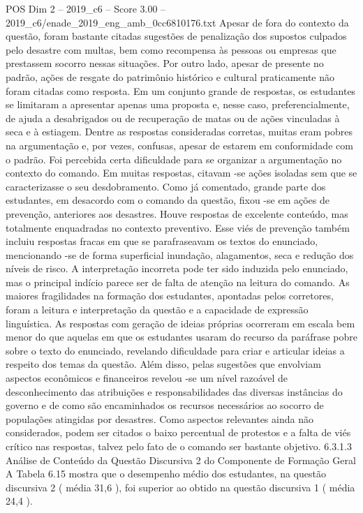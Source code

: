 \begin{textsample}{POS Dim 2 – 2019\_c6 – Score 3.00 – 2019\_c6/enade\_2019\_eng\_amb\_0cc6810176.txt}
Apesar de fora do contexto da questão, foram bastante citadas sugestões de penalização dos supostos culpados pelo desastre com multas, bem como recompensa às pessoas ou empresas que prestassem socorro nessas situações.
Por outro lado, apesar de presente no padrão, ações de resgate do patrimônio histórico e cultural praticamente não foram citadas como resposta.
Em um conjunto grande de respostas, os estudantes se limitaram a apresentar apenas uma proposta e, nesse caso, preferencialmente, de ajuda a desabrigados ou de recuperação de matas ou de ações vinculadas à seca e à estiagem.
Dentre as respostas consideradas corretas, muitas eram pobres na argumentação e, por vezes, confusas, apesar de estarem em conformidade com o padrão.
Foi percebida certa dificuldade para se organizar a argumentação no contexto do comando.
Em muitas respostas, citavam -se ações isoladas sem que se caracterizasse o seu desdobramento.
Como já comentado, grande parte dos estudantes, em desacordo com o comando da questão, fixou -se em ações de prevenção, anteriores aos desastres.
Houve respostas de excelente conteúdo, mas totalmente enquadradas no contexto preventivo.
Esse viés de prevenção também incluiu respostas fracas em que se parafraseavam os textos do enunciado, mencionando -se de forma superficial inundação, alagamentos, seca e redução dos níveis de risco.
A interpretação incorreta pode ter sido induzida pelo enunciado, mas o principal indício parece ser de falta de atenção na leitura do comando.
As maiores fragilidades na formação dos estudantes, apontadas pelos corretores, foram a leitura e interpretação da questão e a capacidade de expressão linguística.
As respostas com geração de ideias próprias ocorreram em escala bem menor do que aquelas em que os estudantes usaram do recurso da paráfrase pobre sobre o texto do enunciado, revelando dificuldade para criar e articular ideias a respeito dos temas da questão.
Além disso, pelas sugestões que envolviam aspectos econômicos e financeiros revelou -se um nível razoável de desconhecimento das atribuições e responsabilidades das diversas instâncias do governo e de como são encaminhados os recursos necessários ao socorro de populações atingidas por desastres.
Como aspectos relevantes ainda não considerados, podem ser citados o baixo percentual de protestos e a falta de viés crítico nas respostas, talvez pelo fato de o comando ser bastante objetivo. 6.3.1.3 Análise de Conteúdo da Questão Discursiva 2 do Componente de Formação Geral A Tabela 6.15 mostra que o desempenho médio dos estudantes, na questão discursiva 2 ( média 31,6 ), foi superior ao obtido na questão discursiva 1 ( média 24,4 ).

\end{textsample}

